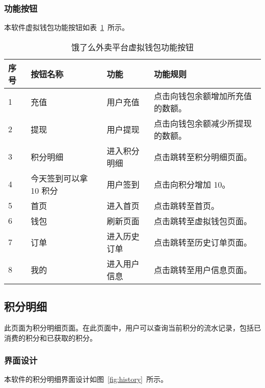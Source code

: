 \subsubsection{功能按钮}
本软件虚拟钱包功能按钮如表~\ref{tab:table8}~所示。
\begin{table}[htbp]
    \caption{饿了么外卖平台虚拟钱包功能按钮}\label{tab:table8}
    \vspace{0.5em}\wuhao
    \begin{tabularx}{\textwidth}{lllX}
    \toprule[1.5pt]
    序号 & 按钮名称 & 功能 & 功能规则 \\ 
    \midrule[1pt]
    1 & 充值 & 用户充值 & 点击向钱包余额增加所充值的数额。 \\
    2 & 提现 & 用户提现 & 点击向钱包余额减少所提现的数额。 \\
    3 & 积分明细 & 进入积分明细 & 点击跳转至积分明细页面。 \\
    4 & 今天签到可以拿 10 积分 & 用户签到 & 点击向积分增加 10。 \\
    5 & 首页 & 进入首页 & 点击跳转至首页。 \\
    6 & 钱包 & 刷新页面 & 点击跳转至虚拟钱包页面。 \\
    7 & 订单 & 进入历史订单 & 点击跳转至历史订单页面。 \\
    8 & 我的 & 进入用户信息 & 点击跳转至用户信息页面。 \\
\bottomrule[1.5pt]
\end{tabularx}
\vspace{\baselineskip}
\end{table}

\subsection{积分明细}
此页面为积分明细页面。在此页面中，用户可以查询当前积分的流水记录，包括已消费的积分和已获取的积分。
\subsubsection{界面设计}
本软件的积分明细界面设计如图~\ref{fig:history}~所示。
